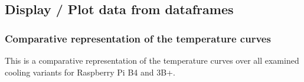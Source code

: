 \documentclass[11pt]{article}
\begin{document}
    \hypertarget{display-plot-data-from-dataframes}{%
\subsection{Display / Plot data from
dataframes}\label{display-plot-data-from-dataframes}}

\hypertarget{comparative-representation-of-the-temperature-curves}{%
\subsubsection{Comparative representation of the temperature
curves}\label{comparative-representation-of-the-temperature-curves}}

This is a comparative representation of the temperature curves over all
examined cooling variants for Raspberry Pi B4 and 3B+.
\end{document}
